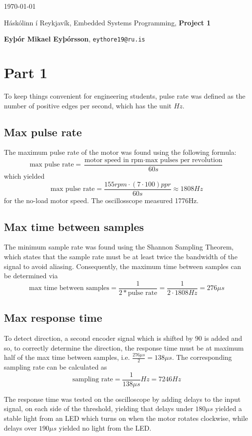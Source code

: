 \documentclass{article}
\begin{document}
\today \par
\vspace{.5cm}
\noindent Háskólinn í Reykjavík, Embedded Systems Programming, \textbf{Project 1} \par
\noindent \textbf{Eyþór Mikael Eyþórsson}, \texttt{eythore19@ru.is}\par

\section*{Part 1}
To keep things convenient for engineering students, pulse rate was defined as the number
of positive edges per second, which has the unit $Hz$.
\subsection*{Max pulse rate}
The maximum pulse rate of the motor was found using the following formula: \[
	\text{max pulse rate} = \frac{\text{motor speed in rpm} \cdot \text{max pulses per
			revolution}}{60s}
\] which yielded \[
	\text{max pulse rate} = \frac{155rpm \cdot (7\cdot 100)ppr}{60s} \approx 1808Hz
\] for the no-load motor speed. The oscillosscope measured 1776Hz.

\subsection*{Max time between samples}
The minimum sample rate was found using the Shannon Sampling Theorem, which
states that the sample rate must be at least twice the bandwidth of the signal to avoid
aliasing. Consequently, the maximum time between samples can be determined via \[
	\text{max time between samples} = \frac{1}{2*\text{pulse rate}} =
	\frac{1}{2\cdot1808Hz} = 276\mu s
\]

\subsection*{Max response time}
To detect direction, a second encoder signal which is shifted by 90\textdegree{} is added
and so, to correctly determine the direction, the response time must be at maximum half of
the max time between samples, i.e. $\frac{276\mu s}{2} = 138\mu s$. The corresponding
sampling rate can be calculated as \[
	\text{sampling rate} = \frac{1}{138\mu s}Hz = 7246Hz
\]

The response time was tested on the oscilloscope by adding delays to the input signal,
on each side of the threshold, yielding that delays under $180\mu s$ yielded a stable
light from an LED which turns on when the motor rotates clockwise, while delays over
$190\mu s$ yielded no light from the LED.
\end{document}
